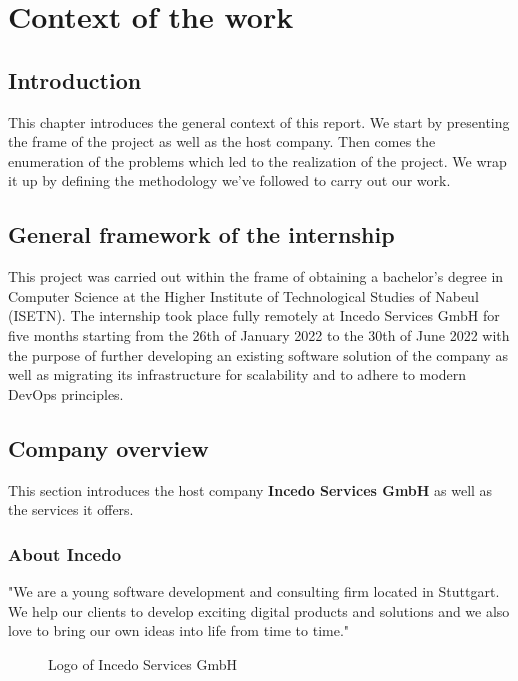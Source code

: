 \chapter{Context of the work}
\minitoc
\newpage

\setcounter{secnumdepth}{0} %
\section{Introduction}
This chapter introduces the general context of this report.
We start by presenting the frame of the project as well as the host company.
Then comes the enumeration of the problems which led to the realization of the project.
We wrap it up by defining the methodology we’ve followed to carry out our work.

\setcounter{secnumdepth}{2} %
\section{General framework of the internship}
This project was carried out within the frame of obtaining a bachelor’s degree in Computer Science at the Higher Institute of Technological Studies of Nabeul (ISETN).
The internship took place fully remotely at Incedo Services GmbH for five months starting from the 26th of January 2022 to the 30th of June 2022 with the purpose of further developing an existing software solution of the company as well as migrating its infrastructure for scalability and to adhere to modern DevOps principles.

\section{Company overview}
This section introduces the host company {\bf Incedo Services GmbH} as well as the services it offers.
\subsection{About Incedo}
"We are a young software development and consulting firm located in Stuttgart.
We help our clients to develop exciting digital products and solutions and we also love to bring our own ideas into life from time to time." \cite{about-incedo}
\begin{figure}[H]
    \centering
    \caption{Logo of Incedo Services GmbH}
    \label{fig:logo-of-incedo}
\end{figure}

